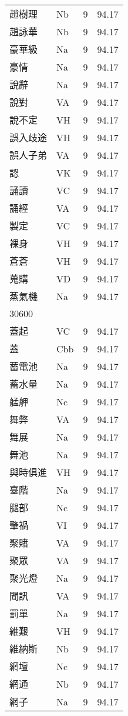 \documentclass[twocolumn]{book}
\begin{document}
\begin{supertabular}{llrr}
趙樹理 & Nb & 9 &  94.17\\
趙詠華 & Nb & 9 &  94.17\\
豪華級 & Na & 9 &  94.17\\
豪情 & Na & 9 &  94.17\\
說辭 & Na & 9 &  94.17\\
說對 & VA & 9 &  94.17\\
說不定 & VH & 9 &  94.17\\
誤入歧途 & VH & 9 &  94.17\\
誤人子弟 & VA & 9 &  94.17\\
認 & VK & 9 &  94.17\\
誦讀 & VC & 9 &  94.17\\
誦經 & VA & 9 &  94.17\\
製定 & VC & 9 &  94.17\\
裸身 & VH & 9 &  94.17\\
蒼蒼 & VH & 9 &  94.17\\
蒐購 & VD & 9 &  94.17\\
蒸氣機 & Na & 9 &  94.17\\
30600\\
蓋起 & VC & 9 &  94.17\\
蓋 & Cbb & 9 &  94.17\\
蓄電池 & Na & 9 &  94.17\\
蓄水量 & Na & 9 &  94.17\\
艋舺 & Nc & 9 &  94.17\\
舞弊 & VA & 9 &  94.17\\
舞展 & Na & 9 &  94.17\\
舞池 & Na & 9 &  94.17\\
與時俱進 & VH & 9 &  94.17\\
臺階 & Na & 9 &  94.17\\
腿部 & Nc & 9 &  94.17\\
肇禍 & VI & 9 &  94.17\\
聚賭 & VA & 9 &  94.17\\
聚眾 & VA & 9 &  94.17\\
聚光燈 & Na & 9 &  94.17\\
聞訊 & VA & 9 &  94.17\\
罰單 & Na & 9 &  94.17\\
維艱 & VH & 9 &  94.17\\
維納斯 & Nb & 9 &  94.17\\
網壇 & Nc & 9 &  94.17\\
網通 & Nb & 9 &  94.17\\
網子 & Na & 9 &  94.17\\

\end{supertabular}
\end{document}
